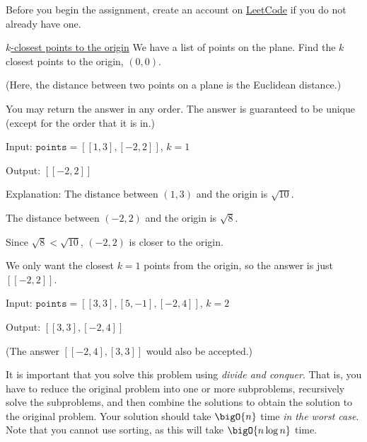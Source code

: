 \documentclass[final]{article}
\begin{document}
\begin{titlepage}
    Before you begin the assignment, create an account on \href{https://leetcode.com/}{LeetCode} if you do not already have one.

    \begin{problem}{\href{https://leetcode.com/problems/k-closest-points-to-origin/}{$k$-closest points to the origin}}{}
    We have a list of points on the plane.  Find the $k$ closest points to the origin, $(0, 0)$.

    (Here, the distance between two points on a plane is the Euclidean distance.)

    You may return the answer in any order. The answer is guaranteed to be unique (except for the order that it is in.)
    \end{problem}

    \begin{example}{}{}
        Input: $\texttt{points} = [[1,3],[-2,2]]$, $k = 1$

        Output: $[[-2,2]]$

        Explanation:
        The distance between $(1, 3)$ and the origin is $\sqrt{10}$.

        The distance between $(-2, 2)$ and the origin is $\sqrt{8}$.

        Since $\sqrt{8} < \sqrt{10}$, $(-2, 2)$ is closer to the origin.

        We only want the closest $k = 1$ points from the origin, so the answer is just $[[-2,2]]$.
    \end{example}

    \begin{example}{}{}
        Input: $\texttt{points} = [[3,3],[5,-1],[-2,4]]$, $k = 2$

        Output: $[[3,3],[-2,4]]$

        (The answer $[[-2,4],[3,3]]$ would also be accepted.)
    \end{example}

    It is important that you solve this problem using \emph{divide and conquer}. That is, you have to reduce the original problem into one or more subproblems, recursively solve the subproblems, and then combine the solutions to obtain the solution to the original problem. Your solution should take $\bigO{n}$ time \emph{in the worst case}.
    Note that you cannot use sorting, as this will take $\bigO{n \log n}$ time.


\end{titlepage}
\end{document}
